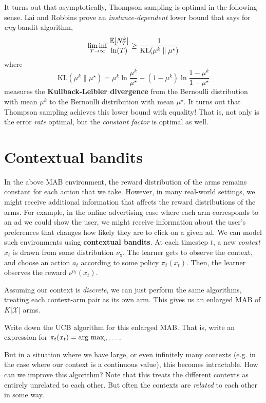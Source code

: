 \documentclass[\main/main]{subfiles}
\begin{document}
It turns out that asymptotically, Thompson sampling is optimal in the following sense. Lai and Robbins \cite{lai_asymptotically_1985} prove an \emph{instance-dependent} lower bound that says for \emph{any} bandit algorithm,
\[
    \liminf_{T \to \infty} \frac{\operatorname*{\mathbb{E}}[N_T^k]}{\ln(T)} \ge \frac{1}{\text{KL}(\mu^k \parallel \mu^\star)}
\]
where \[
    \text{KL}(\mu^k \parallel \mu^\star) = \mu^k \ln \frac{\mu^k}{\mu^\star} + (1 - \mu^k) \ln \frac{1 - \mu^k}{1 - \mu^\star}
\] measures the \textbf{Kullback-Leibler divergence} from the Bernoulli distribution with mean $\mu^k$ to the Bernoulli distribution with mean $\mu^\star$.
It turns out that Thompson sampling achieves this lower bound with equality! That is, not only is the error \emph{rate} optimal, but the \emph{constant factor} is optimal as well.

\iffalse
\section{Gittins index}

\fi

\section{Contextual bandits}

In the above MAB environment, the reward distribution of the arms remains constant for each action that we take.
However, in many real-world settings, we might receive additional information that affects the reward distributions of the arms.
For example, in the online advertising case where each arm corresponds to an ad we could show the user,
we might receive information about the user's preferences that changes how likely they are to click on a given ad.
We can model such environments using \textbf{contextual bandits}.
At each timestep $t$, a new \emph{context} $x_t$ is drawn from some distribution $\nu_{\text{x}}$.
The learner gets to observe the context, and choose an action $a_t$ according to some policy $\pi_t(x_t)$.
Then, the learner observes the reward $\nu^{a_t}(x_t)$.

Assuming our context is \emph{discrete}, we can just perform the same algorithms, treating each context-arm pair as its own arm. This gives us an enlarged MAB of $K |\mathcal{X}|$ arms.

\begin{exercise}
    Write down the UCB algorithm for this enlarged MAB. That is, write an expression for $\pi_t(x_t) = \operatorname*{\textrm{arg\ max}}_a \dots$.
\end{exercise}

But in a situation where we have large, or even infinitely many contexts (e.g. in the case where our context is a continuous value), this becomes intractable.
How can we improve this algorithm?
Note that this treats the different contexts as entirely unrelated to each other.
But often the contexts are \emph{related} to each other in some way.
\end{document}
